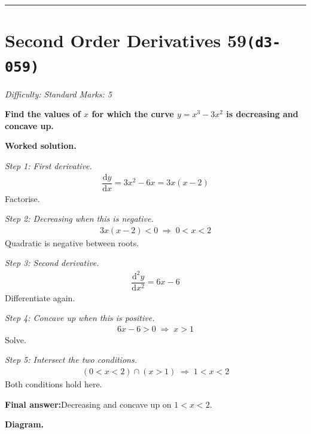 \documentclass[11pt]{article}
\newcommand{\question}[1]{\par\medskip\noindent\textbf{#1}\par}
\begin{document}
\medskip\hrule

\section*{Second Order Derivatives 59\quad\small\texttt{(d3-059)}}
\textit{Difficulty: Standard \quad\textbar\quad Marks: 5}

\question{Find the values of \( x \) for which the curve \( y = x^3 - 3x^2 \) is decreasing and concave up.}

\textbf{Worked solution.}

\textit{Step 1: First derivative.}
\[\begin{gathered}
\dfrac{\mathrm{d}y}{\mathrm{d}x} = 3x^2 - 6x = 3x(x-2)
\end{gathered}\]
Factorise.

\textit{Step 2: Decreasing when this is negative.}
\[\begin{gathered}
3x(x-2) < 0 \;\Rightarrow\; 0 < x < 2
\end{gathered}\]
Quadratic is negative between roots.

\textit{Step 3: Second derivative.}
\[\begin{gathered}
\dfrac{\mathrm{d}^2y}{\mathrm{d}x^2} = 6x - 6
\end{gathered}\]
Differentiate again.

\textit{Step 4: Concave up when this is positive.}
\[\begin{gathered}
6x - 6 > 0 \;\Rightarrow\; x > 1
\end{gathered}\]
Solve.

\textit{Step 5: Intersect the two conditions.}
\[\begin{gathered}
(0 < x < 2) \cap (x > 1) \;\Rightarrow\; 1 < x < 2
\end{gathered}\]
Both conditions hold here.

\begin{answerbox}
\textbf{Final answer:}\quad Decreasing and concave up on \(\displaystyle  1 < x < 2 \).
\end{answerbox}
\textbf{Diagram.}
\end{document}
